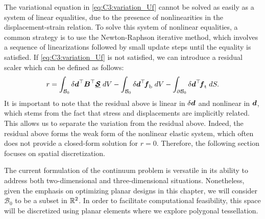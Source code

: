 The variational equation in \eqref{eq:C3:variation_Uf} cannot be solved as easily as a system of linear equalities, due to the presence of nonlinearities in the displacement-strain relation. To solve this system of nonlinear equalities, a common strategy is to use the Newton-Raphson iterative method, which involves a sequence of linearizations followed by small update steps until the equality is satisfied. If \eqref{eq:C3:variation_Uf} is not satisfied, we can introduce a residual scaler which can be defined as follows:
%
\begin{equation}
r = \int_{\mathcal{B}_0} \delta {\boldsymbol{d}}^\top {\boldsymbol{B}}^\top \underline{\boldsymbol{\mathcal{S}}}\; dV - \int_{\mathcal{B}_0}  \delta {\boldsymbol{d}}^\top \! {\boldsymbol{f}}_{\textrm{b}} \; dV - \int_{\partial \mathcal{B}_0}  \delta {\boldsymbol{d}}^\top \! {\boldsymbol{f}}_{\textrm{t}}  \; dS.
\label{eq:C3:residual_scalar}
\end{equation}
%
It is important to note that the residual above is linear in $\delta {\boldsymbol{d}}$ and nonlinear in ${\boldsymbol{d}}$, which stems from the fact that stress and displacements are implicitly related. This allows us to separate the variation from the residual above. Indeed, the residual above forms the weak form of the nonlinear elastic system, which often does not provide a closed-form solution for $r = 0$. Therefore, the following section focuses on spatial discretization.

\begin{rmk}
The current formulation of the continuum problem is versatile in its ability to address both two-dimensional and three-dimensional situations. Nonetheless, given the emphasis on optimizing planar designs in this chapter, we will consider $\mathcal{B}_0$ to be a subset in $\mathbb{R}^2$. In order to facilitate computational feasibility, this space will be discretized using planar elements where we explore polygonal tessellation.
\end{rmk}




